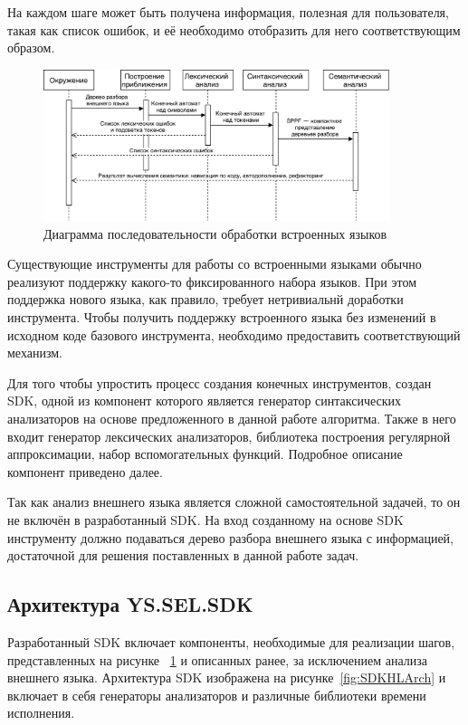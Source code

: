 На каждом шаге может быть получена информация, полезная для пользователя, такая как список ошибок, и её необходимо отобразить для него соответствующим образом.

\begin{figure}[h!]
\begin{center}
\includegraphics[width=0.9\textwidth]{pics/Seq_sel_processing_rus}
\caption{Диаграмма последовательности обработки встроенных языков}
\label{fig:SeqSelProcessing} 
\end{center}
\end{figure}


Существующие инструменты для работы со встроенными языками обычно реализуют поддержку какого-то фиксированного набора языков. При этом поддержка нового языка, как правило, требует нетривиальнй доработки инструмента. Чтобы получить поддержку встроенного языка без изменений в исходном коде базового инструмента, необходимо предоставить соответствующий механизм. 

Для того чтобы упростить процесс создания конечных инструментов, создан SDK, одной из компонент которого является генератор синтаксических анализаторов на основе предложенного в данной работе алгоритма. Также в него входит генератор лексических анализаторов, библиотека построения регулярной аппроксимации, набор вспомогательных функций. Подробное описание компонент приведено далее.

Так как анализ внешнего языка является сложной самостоятельной задачей, то он не включён в разработанный SDK. На вход созданному на основе SDK инструменту должно подаваться дерево разбора внешнего языка с информацией, достаточной для решения поставленных в данной работе задач. 


\subsection{Архитектура YS.SEL.SDK}

Разработанный SDK включает компоненты, необходимые для реализации шагов, представленных на рисунке ~\ref{fig:SeqSelProcessing} и описанных ранее, за исключением анализа внешнего языка. Архитектура SDK изображена на рисунке~\ref{fig:SDKHLArch} и включает в себя генераторы анализаторов и различные библиотеки времени исполнения.


